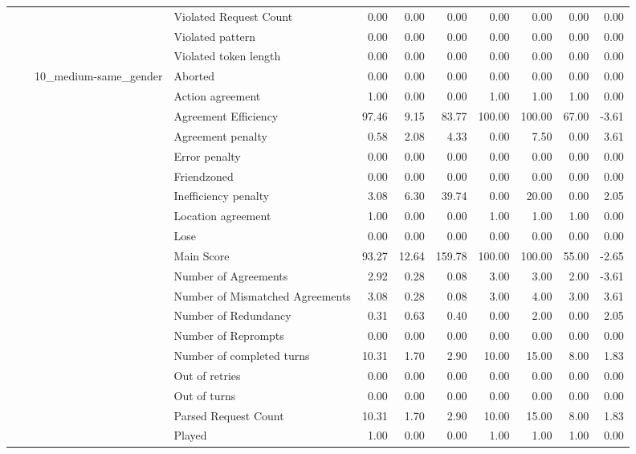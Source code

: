 \begin{tabular}{llllrrrrrrr}
 &  &  & Violated Request Count & 0.00 & 0.00 & 0.00 & 0.00 & 0.00 & 0.00 & 0.00 \\
 &  &  & Violated pattern & 0.00 & 0.00 & 0.00 & 0.00 & 0.00 & 0.00 & 0.00 \\
 &  &  & Violated token length & 0.00 & 0.00 & 0.00 & 0.00 & 0.00 & 0.00 & 0.00 \\
\cline{3-11}
 &  & \multirow[t]{27}{*}{10_medium-same_gender} & Aborted & 0.00 & 0.00 & 0.00 & 0.00 & 0.00 & 0.00 & 0.00 \\
 &  &  & Action agreement & 1.00 & 0.00 & 0.00 & 1.00 & 1.00 & 1.00 & 0.00 \\
 &  &  & Agreement Efficiency & 97.46 & 9.15 & 83.77 & 100.00 & 100.00 & 67.00 & -3.61 \\
 &  &  & Agreement penalty & 0.58 & 2.08 & 4.33 & 0.00 & 7.50 & 0.00 & 3.61 \\
 &  &  & Error penalty & 0.00 & 0.00 & 0.00 & 0.00 & 0.00 & 0.00 & 0.00 \\
 &  &  & Friendzoned & 0.00 & 0.00 & 0.00 & 0.00 & 0.00 & 0.00 & 0.00 \\
 &  &  & Inefficiency penalty & 3.08 & 6.30 & 39.74 & 0.00 & 20.00 & 0.00 & 2.05 \\
 &  &  & Location agreement & 1.00 & 0.00 & 0.00 & 1.00 & 1.00 & 1.00 & 0.00 \\
 &  &  & Lose & 0.00 & 0.00 & 0.00 & 0.00 & 0.00 & 0.00 & 0.00 \\
 &  &  & Main Score & 93.27 & 12.64 & 159.78 & 100.00 & 100.00 & 55.00 & -2.65 \\
 &  &  & Number of Agreements & 2.92 & 0.28 & 0.08 & 3.00 & 3.00 & 2.00 & -3.61 \\
 &  &  & Number of Mismatched Agreements & 3.08 & 0.28 & 0.08 & 3.00 & 4.00 & 3.00 & 3.61 \\
 &  &  & Number of Redundancy & 0.31 & 0.63 & 0.40 & 0.00 & 2.00 & 0.00 & 2.05 \\
 &  &  & Number of Reprompts & 0.00 & 0.00 & 0.00 & 0.00 & 0.00 & 0.00 & 0.00 \\
 &  &  & Number of completed turns & 10.31 & 1.70 & 2.90 & 10.00 & 15.00 & 8.00 & 1.83 \\
 &  &  & Out of retries & 0.00 & 0.00 & 0.00 & 0.00 & 0.00 & 0.00 & 0.00 \\
 &  &  & Out of turns & 0.00 & 0.00 & 0.00 & 0.00 & 0.00 & 0.00 & 0.00 \\
 &  &  & Parsed Request Count & 10.31 & 1.70 & 2.90 & 10.00 & 15.00 & 8.00 & 1.83 \\
 &  &  & Played & 1.00 & 0.00 & 0.00 & 1.00 & 1.00 & 1.00 & 0.00 \\

\end{tabular}
